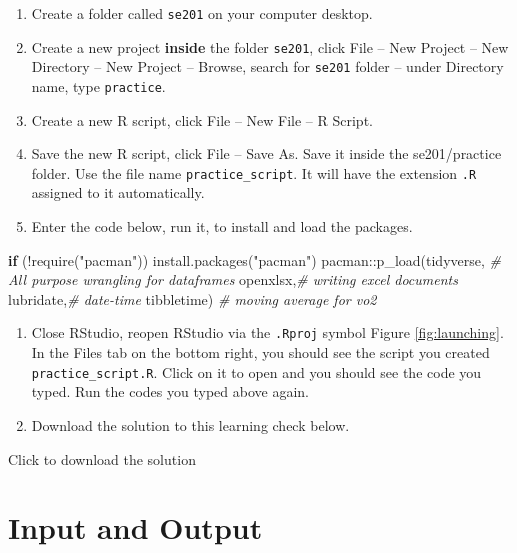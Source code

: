 \documentclass[
]{book}
\newenvironment{Shaded}{\begin{snugshade}}{\end{snugshade}}
\newcommand{\CommentTok}[1]{\textcolor[rgb]{0.56,0.35,0.01}{\textit{#1}}}
\newcommand{\ControlFlowTok}[1]{\textcolor[rgb]{0.13,0.29,0.53}{\textbf{#1}}}
\newcommand{\FunctionTok}[1]{\textcolor[rgb]{0.00,0.00,0.00}{#1}}
\newcommand{\NormalTok}[1]{#1}
\newcommand{\SpecialCharTok}[1]{\textcolor[rgb]{0.00,0.00,0.00}{#1}}
\newcommand{\StringTok}[1]{\textcolor[rgb]{0.31,0.60,0.02}{#1}}
\begin{document}
\begin{enumerate}
\def\labelenumi{\arabic{enumi}.}
\item
  Create a folder called \texttt{se201} on your computer desktop.
\item
  Create a new project \textbf{inside} the folder \texttt{se201}, click File -- New Project -- New Directory -- New Project -- Browse, search for \texttt{se201} folder -- under Directory name, type \texttt{practice}.
\item
  Create a new R script, click File -- New File -- R Script.
\item
  Save the new R script, click File -- Save As. Save it inside the se201/practice folder. Use the file name \texttt{practice\_script}. It will have the extension \texttt{.R} assigned to it automatically.
\item
  Enter the code below, run it, to install and load the packages.
\end{enumerate}

\begin{Shaded}
\begin{Highlighting}[]
\ControlFlowTok{if}\NormalTok{ (}\SpecialCharTok{!}\FunctionTok{require}\NormalTok{(}\StringTok{"pacman"}\NormalTok{)) }\FunctionTok{install.packages}\NormalTok{(}\StringTok{"pacman"}\NormalTok{)}
\NormalTok{pacman}\SpecialCharTok{::}\FunctionTok{p\_load}\NormalTok{(tidyverse, }\CommentTok{\# All purpose wrangling for dataframes}
\NormalTok{               openxlsx,}\CommentTok{\# writing excel documents}
\NormalTok{               lubridate,}\CommentTok{\# date{-}time }
\NormalTok{               tibbletime) }\CommentTok{\# moving average for vo2}
\end{Highlighting}
\end{Shaded}

\begin{enumerate}
\def\labelenumi{\arabic{enumi}.}
\setcounter{enumi}{5}
\item
  Close RStudio, reopen RStudio via the \texttt{.Rproj} symbol Figure \ref{fig:launching}. In the Files tab on the bottom right, you should see the script you created \texttt{practice\_script.R}. Click on it to open and you should see the code you typed. Run the codes you typed above again.
\item
  Download the solution to this learning check below.
\end{enumerate}

Click to download the solution

\hypertarget{InputOuput}{%
\chapter{Input and Output}\label{InputOuput}}
\end{document}
